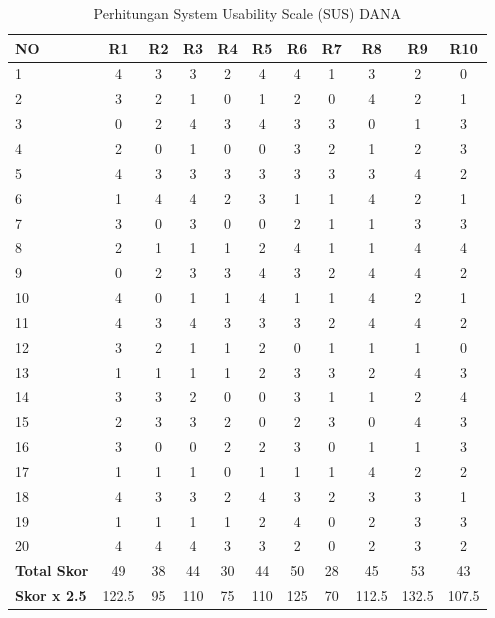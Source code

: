 \documentclass[
 manuscript=article,  %
  layout=publish, 
  year=2024, 
  month= Februari, %
  volume=8,
  number=1 
]{JIKO}
\begin{document}
\begin{table}[H]
    \begin{threeparttable}
        \caption{Perhitungan System Usability Scale (SUS) DANA}
        \label{tabel:sus_dana}
        \begin{tabular}{l*{10}{c}}
            \toprule
            \textbf{NO} & \textbf{R1} & \textbf{R2} & \textbf{R3} & \textbf{R4} & \textbf{R5} & \textbf{R6} & \textbf{R7} & \textbf{R8} & \textbf{R9} & \textbf{R10} \\
            \midrule
            1  & 4 & 3 & 3 & 2 & 4 & 4 & 1 & 3 & 2 & 0 \\
            2  & 3 & 2 & 1 & 0 & 1 & 2 & 0 & 4 & 2 & 1 \\
            3  & 0 & 2 & 4 & 3 & 4 & 3 & 3 & 0 & 1 & 3 \\
            4  & 2 & 0 & 1 & 0 & 0 & 3 & 2 & 1 & 2 & 3 \\
            5  & 4 & 3 & 3 & 3 & 3 & 3 & 3 & 3 & 4 & 2 \\
            6  & 1 & 4 & 4 & 2 & 3 & 1 & 1 & 4 & 2 & 1 \\
            7  & 3 & 0 & 3 & 0 & 0 & 2 & 1 & 1 & 3 & 3 \\
            8  & 2 & 1 & 1 & 1 & 2 & 4 & 1 & 1 & 4 & 4 \\
            9  & 0 & 2 & 3 & 3 & 4 & 3 & 2 & 4 & 4 & 2 \\
            10 & 4 & 0 & 1 & 1 & 4 & 1 & 1 & 4 & 2 & 1 \\
            11 & 4 & 3 & 4 & 3 & 3 & 3 & 2 & 4 & 4 & 2 \\
            12 & 3 & 2 & 1 & 1 & 2 & 0 & 1 & 1 & 1 & 0 \\
            13 & 1 & 1 & 1 & 1 & 2 & 3 & 3 & 2 & 4 & 3 \\
            14 & 3 & 3 & 2 & 0 & 0 & 3 & 1 & 1 & 2 & 4 \\
            15 & 2 & 3 & 3 & 2 & 0 & 2 & 3 & 0 & 4 & 3 \\
            16 & 3 & 0 & 0 & 2 & 2 & 3 & 0 & 1 & 1 & 3 \\
            17 & 1 & 1 & 1 & 0 & 1 & 1 & 1 & 4 & 2 & 2 \\
            18 & 4 & 3 & 3 & 2 & 4 & 3 & 2 & 3 & 3 & 1 \\
            19 & 1 & 1 & 1 & 1 & 2 & 4 & 0 & 2 & 3 & 3 \\
            20 & 4 & 4 & 4 & 3 & 3 & 2 & 0 & 2 & 3 & 2 \\
            \midrule
            \textbf{Total Skor}   & 49 & 38 & 44 & 30 & 44 & 50 & 28 & 45 & 53 & 43 \\
            \textbf{Skor x 2.5}   & 122.5 & 95 & 110 & 75 & 110 & 125 & 70 & 112.5 & 132.5 & 107.5 \\
            \bottomrule
        \end{tabular}
    \end{threeparttable}
\end{table}
\end{document}
